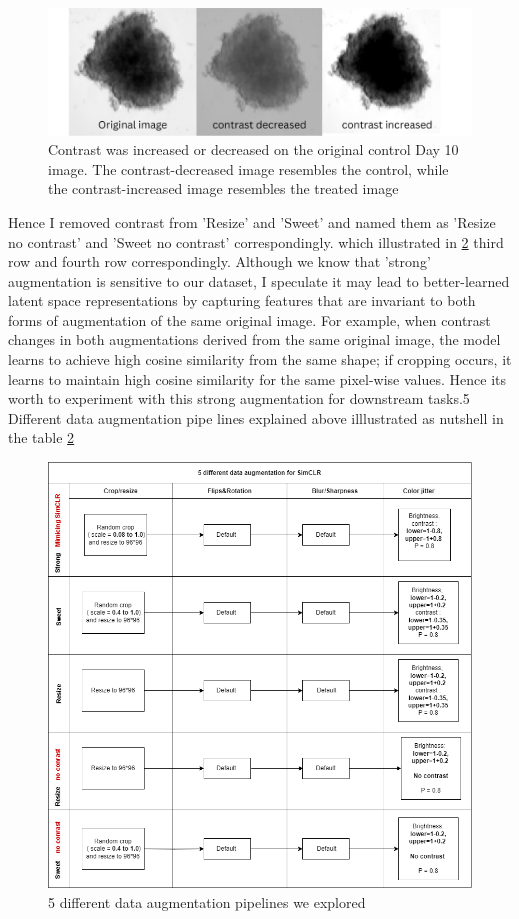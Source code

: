 \begin{figure}[H]
  \centering
  \includegraphics[scale=0.]{figures/ohne.png} 
  \caption{Contrast was increased or decreased on the original control Day 10 image. The contrast-decreased image resembles the control, while the contrast-increased image resembles the treated image}
  \label{fig:ohne}
\end{figure}
Hence I removed contrast from 'Resize' and 'Sweet' and named them as 'Resize no contrast' and 'Sweet no contrast' correspondingly. 
which illustrated in \ref{fig:strong_aug} third row and fourth row correspondingly. 
Although we know that 'strong' augmentation is sensitive to our dataset, I speculate it may lead to better-learned latent space representations by capturing features that are invariant to both forms of augmentation of the same original image. For example, when contrast changes in both augmentations derived from the same original image, the model learns to achieve high cosine similarity from the same shape; if cropping occurs, it learns to maintain high cosine similarity for the same pixel-wise values. Hence its worth to experiment with this strong augmentation for downstream tasks.5 Different data augmentation pipe lines explained above illlustrated as nutshell in the table \ref{fig:strong_aug}
\begin{figure}[H]
  \centering
  \includegraphics[scale=0.5]{figures/diff_aug.png} 
  \caption{5 different data augmentation pipelines we explored}
  \label{fig:strong_aug}
\end{figure}




